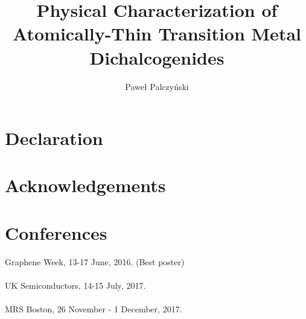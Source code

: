 \documentclass[12pt, a4paper]{report}
\author{Paweł Palczyński}
\title{Physical Characterization of Atomically-Thin Transition Metal Dichalcogenides}
\begin{document}


\section*{Declaration}

\newpage
\section*{Acknowledgements}

\newpage


\section*{Conferences}

Graphene Week, 13-17 June, 2016. (Best poster)\\ \\
UK Semiconductors, 14-15 July, 2017.\\ \\
MRS Boston, 26 November - 1 December, 2017.

\newpage


\tableofcontents
















\appendix
%


{}
\end{document}
